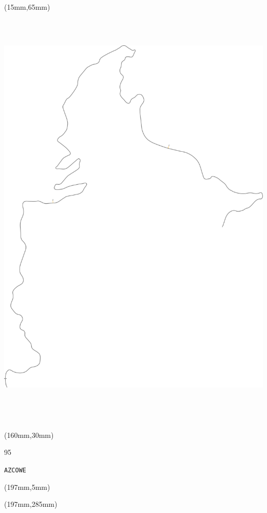 \begin{textblock*}{185mm}(15mm,65mm)%
\centering
\mbox{\includegraphics[width=185mm,height=210mm,keepaspectratio]{PT/AZCOWE.pdf}}
\end{textblock*}
\begin{textblock*}{40mm}(160mm,30mm)%
\Large
\par{} 
\par95 
\par\hfill\tiny\tt AZCOWE\\
\end{textblock*}
\begin{textblock*}{20mm}(197mm,5mm)%
\fbox{\thepage}
\label{AZCOWE}
\end{textblock*}
\begin{textblock*}{20mm}(197mm,285mm)%
\fbox{\thepage}
\end{textblock*}


